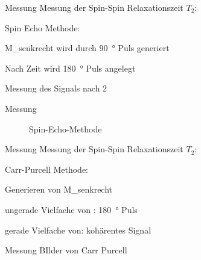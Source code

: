 \begin{frame}{Messung}
Messung der Spin-Spin Relaxationszeit $T_2$:
\item Spin Echo Methode:
	\item M_{senkrecht} wird durch  \SI{90}{\degree} Puls generiert
	\item Nach Zeit \tau wird  \SI{180}{\degree} Puls angelegt
	\item Messung des Signals nach 2\tau
\end{frame}

\begin{frame}{Messung}
	\begin{figure}
	\centering
	
	\caption{Spin-Echo-Methode}
	\end{figure}
\end{frame}

\begin{frame}{Messung}
Messung der Spin-Spin Relaxationszeit $T_2$:
\item Carr-Purcell Methode:
	\item Generieren von M_{senkrecht}
	\item ungerade Vielfache von \tau:  \SI{180}{\degree} Puls
	\item gerade Vielfache von\tau:  kohärentes Signal
\end{frame}

\begin{frame}{Messung}
BIlder von Carr Purcell
\end{frame}

